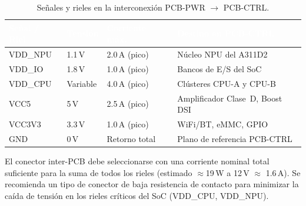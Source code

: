 \begin{table}[H]
  \centering
  \caption{Señales y rieles en la interconexión PCB-PWR $\to$ PCB-CTRL.}
  \label{tab:interconexion}
  \begin{tabularx}{\textwidth}{C{2.5cm} C{2cm} C{2.5cm} L{5.5cm}}
    \toprule
    \textcolor{white}{\textbf{Señal / Riel}} &
    \textcolor{white}{\textbf{Tensión}} &
    \textcolor{white}{\textbf{Corriente máx.}} &
    \textcolor{white}{\textbf{Destino en PCB-CTRL}} \\
    \midrule
    VDD\_NPU  & 1.1\,V & 2.0\,A (pico) & Núcleo NPU del A311D2 \\
    VDD\_IO   & 1.8\,V & 1.0\,A (pico) & Bancos de E/S del SoC \\
    VDD\_CPU  & Variable & 4.0\,A (pico) & Clústeres CPU-A y CPU-B \\
    VCC5      & 5\,V   & 2.5\,A (pico) & Amplificador Clase~D, Boost DSI \\
    VCC3V3    & 3.3\,V & 1.0\,A (pico) & WiFi/BT, eMMC, GPIO \\
    GND       & 0\,V   & Retorno total & Plano de referencia PCB-CTRL \\
    \bottomrule
  \end{tabularx}
\end{table}

\begin{infobox}
  El conector inter-PCB debe seleccionarse con una corriente nominal total
  suficiente para la suma de todos los rieles (estimado $\approx$19\,W a 12\,V
  $\approx$ 1.6\,A). Se recomienda un tipo de conector de baja resistencia de
  contacto para minimizar la caída de tensión en los rieles críticos del SoC
  (VDD\_CPU, VDD\_NPU).
\end{infobox}
